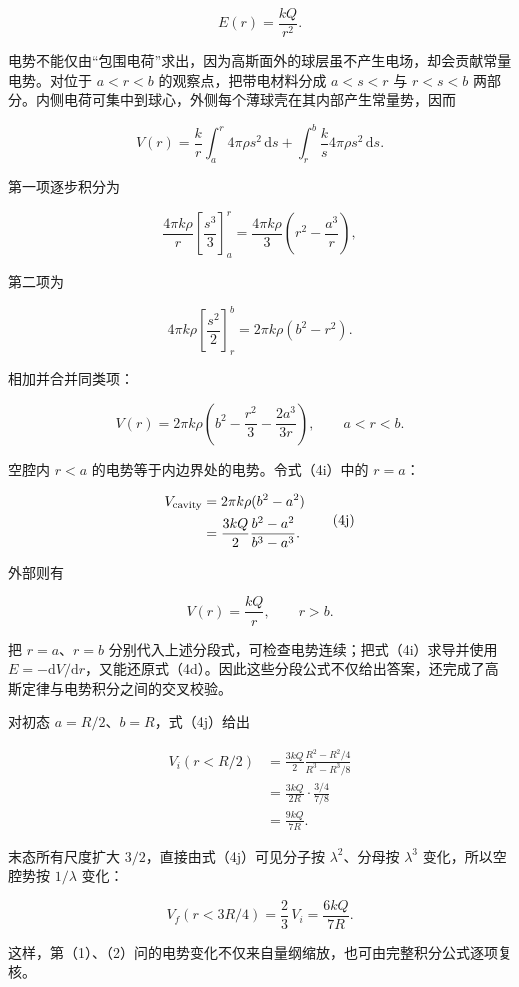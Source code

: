 \documentclass[12pt,a4paper,UTF8]{ctexart}
\begin{document}
\[
E(r)=\frac{kQ}{r^2}.
\tag{4e}
\]

电势不能仅由``包围电荷''求出，因为高斯面外的球层虽不产生电场，却会贡献常量电势。对位于
\(a<r<b\) 的观察点，把带电材料分成 \(a<s<r\) 与 \(r<s<b\)
两部分。内侧电荷可集中到球心，外侧每个薄球壳在其内部产生常量势，因而

\[
V(r)
=\frac{k}{r}\int_a^r4\pi\rho s^2\,\mathrm ds
+\int_r^b\frac{k}{s}4\pi\rho s^2\,\mathrm ds.
\tag{4f}
\]

第一项逐步积分为

\[
\frac{4\pi k\rho}{r}
\left[\frac{s^3}{3}\right]_a^r
=\frac{4\pi k\rho}{3}
\left(r^2-\frac{a^3}{r}\right),
\tag{4g}
\]

第二项为

\[
4\pi k\rho\left[\frac{s^2}{2}\right]_r^b
=2\pi k\rho(b^2-r^2).
\tag{4h}
\]

相加并合并同类项：

\[
\boxed{
V(r)=2\pi k\rho
\left(b^2-\frac{r^2}{3}-\frac{2a^3}{3r}\right),
\qquad a<r<b
}.
\tag{4i}
\]

空腔内 \(r<a\) 的电势等于内边界处的电势。令式（4i）中的 \(r=a\)：

\[
\begin{aligned}
V_{\rm cavity}
&=2\pi k\rho(b^2-a^2)\\
&=\frac{3kQ}{2}
\frac{b^2-a^2}{b^3-a^3}.
\end{aligned}
\tag{4j}
\]

外部则有

\[
V(r)=\frac{kQ}{r},
\qquad r>b.
\tag{4k}
\]

把 \(r=a\)、\(r=b\)
分别代入上述分段式，可检查电势连续；把式（4i）求导并使用
\(E=-\mathrm dV/\mathrm dr\)，又能还原式（4d）。因此这些分段公式不仅给出答案，还完成了高斯定律与电势积分之间的交叉校验。

对初态 \(a=R/2\)、\(b=R\)，式（4j）给出

\[
\begin{aligned}
V_i(r<R/2)
&=\frac{3kQ}{2}
\frac{R^2-R^2/4}{R^3-R^3/8}\\
&=\frac{3kQ}{2R}\cdot\frac{3/4}{7/8}\\
&=\frac{9kQ}{7R}.
\end{aligned}
\tag{4l}
\]

末态所有尺度扩大 \(3/2\)，直接由式（4j）可见分子按 \(\lambda^2\)、分母按
\(\lambda^3\) 变化，所以空腔势按 \(1/\lambda\) 变化：

\[
V_f(r<3R/4)
=\frac23\,V_i
=\frac{6kQ}{7R}.
\tag{4m}
\]

这样，第（1）、（2）问的电势变化不仅来自量纲缩放，也可由完整积分公式逐项复核。
\end{document}
